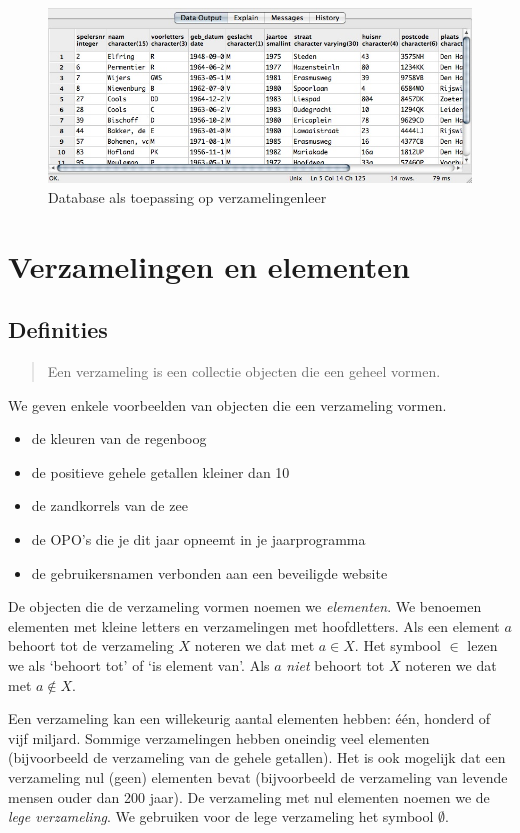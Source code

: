 \begin{figure}[htbp]
\centering
\includegraphics[width=\textwidth]{figuren/verzamelingen_relaties/database.jpg}
\caption{Database als toepassing op verzamelingenleer}
\label{fig:database}
\end{figure}

\section{Verzamelingen en elementen}
\subsection{Definities}
\begin{quote}
Een verzameling is een collectie objecten die een geheel vormen.
\end{quote}
We geven enkele voorbeelden van objecten die een verzameling vormen.
\begin{itemize}
\item  de kleuren van de regenboog 
\item de positieve gehele getallen kleiner dan 10
\item de zandkorrels van de zee
\item de OPO's die je dit jaar opneemt in je jaarprogramma 
\item de gebruikersnamen verbonden aan een beveiligde website
\end{itemize}

De objecten die de verzameling vormen noemen we  \emph{elementen}. We benoemen elementen met kleine letters en verzamelingen met hoofdletters. Als een element $a$ behoort tot de verzameling $X$ noteren we dat met $a \in X$. Het symbool $\in$ lezen we als `behoort tot' of `is element van'. Als $a$ \emph{niet} behoort tot $X$ noteren we dat met $a\not \in X $.

Een verzameling kan een willekeurig aantal elementen hebben: \'e\'en, honderd of vijf miljard. Sommige verzamelingen hebben oneindig veel elementen (bijvoorbeeld de verzameling van de gehele getallen). Het is ook mogelijk dat een verzameling nul (geen) elementen bevat (bijvoorbeeld de verzameling van levende mensen ouder dan 200 jaar). De verzameling met nul elementen noemen we de \emph{lege verzameling}. We gebruiken voor de lege verzameling het symbool $\emptyset$.

